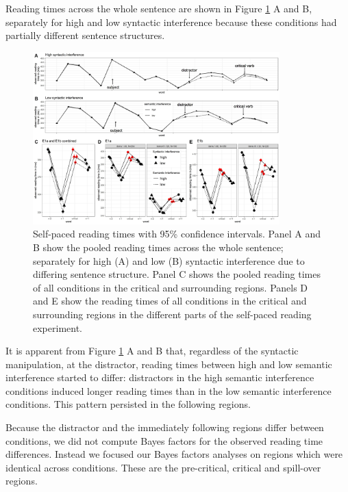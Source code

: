 \documentclass[a4paper, man, floatsintext]{apa7}
\begin{document}
Reading times across the whole sentence are shown in Figure \ref{fig:whole_sentence} A and B, separately for high and low syntactic interference because these conditions had partially different sentence structures. 

\begin{figure}
    \caption{Self-paced reading times with 95\% confidence intervals. Panel A and B show the pooled reading times across the whole sentence; separately for high (A) and low (B) syntactic interference due to differing sentence structure. Panel C shows the pooled reading times of all conditions in the critical and surrounding regions. Panels D and E show the reading times of all conditions in the critical and surrounding regions in the different parts of the self-paced reading experiment.}
    \label{fig:whole_sentence}
    \centering
    \includegraphics[width=0.85\textwidth]{images/Pandora_all_wholesentence_pooled_zoom_exp.jpg}
\end{figure}
\clearpage

It is apparent from Figure \ref{fig:whole_sentence} A and B that, regardless of the syntactic manipulation, at the distractor, reading times between high and low semantic interference started to differ: distractors in the high semantic interference conditions induced longer reading times than in the low semantic interference conditions. This pattern persisted in the following regions.

Because the distractor and the immediately following regions differ between conditions, we did not compute Bayes factors for the observed reading time differences. Instead we focused our Bayes factors analyses on regions which were identical across conditions. These are the pre-critical, critical and spill-over regions.
\end{document}
